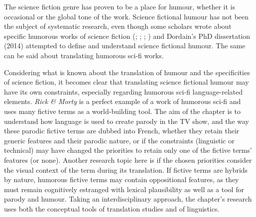 \documentclass[output=paper]{langscibook}
\begin{document}
The science fiction genre has proven to be a place for humour, whether it is occasional or the global tone of the work. Science fictional humour has not been the subject of systematic research, even though some scholars wrote about specific humorous works of science fiction (\citealt{Rosinsky1982}; \citealt{Traub2018}; \citealt{Koltun2018}; \citealt{Candelaria2018}) and Dordain’s PhD dissertation (2014) attempted to define and understand science fictional humour. The same can be said about translating humorous sci-fi works.

Considering what is known about the translation of humour and the specificities of science fiction, it becomes clear that translating science fictional humour may have its own constraints, especially regarding humorous sci-fi language-related elements. \textit{Rick \& Morty} is a perfect example of a work of humorous sci-fi and uses many fictive terms as a world-building tool. The aim of the chapter is to understand how language is used to create parody in the TV show, and the way these parodic fictive terms are dubbed into French, whether they retain their generic features and their parodic nature, or if the constraints (linguistic or technical) may have changed the priorities to retain only one of the fictive terms’ features (or none). Another research topic here is if the chosen priorities consider the visual context of the term during its translation. If fictive terms are hybrids by nature, humorous fictive terms may contain oppositional features, as they must remain cognitively estranged with lexical plausibility as well as a tool for parody and humour. Taking an interdisciplinary approach, the chapter’s research uses both the conceptual tools of translation studies and of linguistics.
\end{document}
